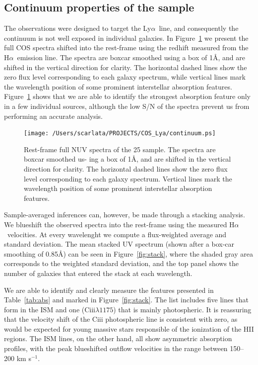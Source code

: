 \documentclass[manuscript]{emulateapj}
\newcommand{\lya}{Ly$\alpha$}
\newcommand{\ha}{H$\alpha$}
\begin{document}
\subsection{Continuum properties of the sample}
The observations were designed to target the \lya\ line, and
consequently the continuum is not well exposed in individual galaxies.
In Figure~\ref{fig:spectra_full} we present the full COS spectra
shifted into the rest-frame using the redhift measured from the \ha\
emission line. The spectra are boxcar smoothed using a box of 1\AA,
and are shifted in the vertical direction for clarity.  The horizontal
dashed lines show the zero flux level corresponding to each galaxy
spectrum, while vertical lines mark the wavelength position of some
prominent interstellar absorption
features. Figure~\ref{fig:spectra_full} shows that we are able to
identify the strongest absorption feature only in a few individual
sources, although the low S/N of the spectra prevent us from performing
an accurate analysis.


\begin{figure}[h!]
   \centering
  \texttt{[image: /Users/scarlata/PROJECTS/COS\_Lya/continuum.ps]}
   \caption{Rest-frame full NUV spectra of the 25 sample. The spectra are boxcar smoothed us-
ing a box of 1\AA, and are shifted in the vertical direction
for clarity. The horizontal dashed lines show the zero flux level corresponding
to each galaxy spectrum. Vertical lines mark the wavelength position
of some prominent interstellar absorption features.}
  \label{fig:spectra_full}
\end{figure}

Sample-averaged inferences can, however, be made through a stacking
analysis. We blueshift the observed spectra into the rest-frame using
the measured \ha\ velocities. At every wavelenght we compute a
flux-weighted average and standard deviation. The mean stacked UV
spectrum (shown after a box-car smoothing of 0.85\AA) can be seen in
Figure~\ref{fig:stack}, where the shaded gray area corresponds to the
weighted standard deviation, and the top panel shows the number of
galaxies that entered the stack at each wavelength.

We are able to identify and clearly measure the features presented in
Table~\ref{tab:abs} and marked in Figure~\ref{fig:stack}. The list
includes five lines that form in the ISM and one (C{\sc iii}$\lambda
1175$) that is mainly photospheric. It is reassuring that the velocity
shift of the C{\sc iii} photospheric line is consistent with zero, as
would be expected for young massive stars responsible of the
ionization of the HII regions. The ISM lines, on the other hand, all
show asymmetric absorption profiles, with the peak  blueshifted outflow velocities in the range between 150--200 km
s$^{-1}$. 
\end{document}
